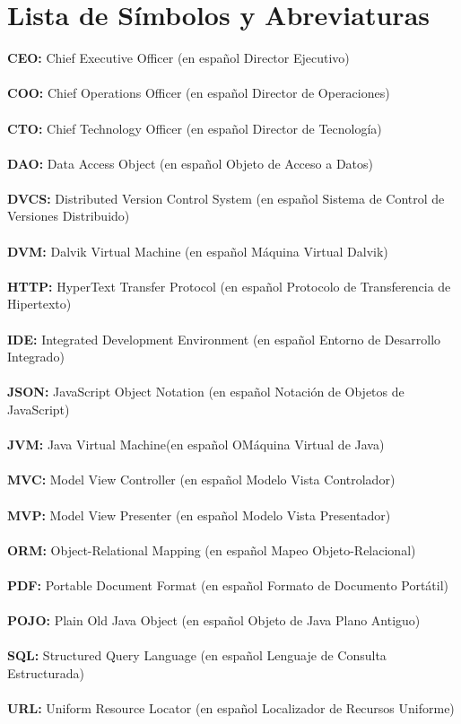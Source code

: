 \chapter*{Lista de Símbolos y Abreviaturas}%

\vspace{5 mm}
\noindent
\textbf{CEO:} Chief Executive Officer (en español Director Ejecutivo)\\ \\
\textbf{COO:} Chief Operations Officer (en español Director de Operaciones)\\ \\
\textbf{CTO:} Chief Technology Officer (en español Director de Tecnología)\\ \\
\textbf{DAO:} Data Access Object (en español Objeto de Acceso a Datos)\\ \\
\textbf{DVCS:} Distributed Version Control System (en español Sistema de Control de Versiones Distribuido)\\ \\
\textbf{DVM:} Dalvik Virtual Machine (en español Máquina Virtual Dalvik)\\ \\
\textbf{HTTP:} HyperText Transfer Protocol (en español Protocolo de Transferencia de Hipertexto)\\ \\
\textbf{IDE:} Integrated Development Environment (en español Entorno de Desarrollo Integrado)\\ \\
\textbf{JSON:} JavaScript Object Notation (en español Notación de Objetos de JavaScript)\\ \\
\textbf{JVM:} Java Virtual Machine(en español OMáquina Virtual de Java)\\ \\
\textbf{MVC:} Model View Controller (en español Modelo Vista Controlador)\\ \\
\textbf{MVP:} Model View Presenter (en español Modelo Vista Presentador)\\ \\
\textbf{ORM:} Object-Relational Mapping (en español Mapeo Objeto-Relacional)\\ \\
\textbf{PDF:} Portable Document Format (en español Formato de Documento Portátil)\\ \\
\textbf{POJO:} Plain Old Java Object (en español Objeto de Java Plano Antiguo)\\ \\
\textbf{SQL:} Structured Query Language (en español Lenguaje de Consulta Estructurada)\\ \\
\textbf{URL:} Uniform Resource Locator (en español Localizador de Recursos Uniforme)